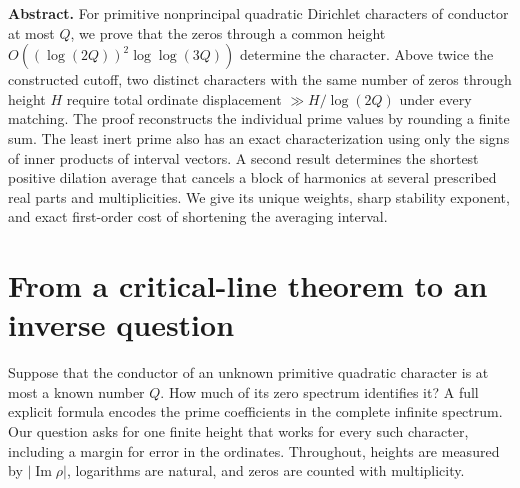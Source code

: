 \documentclass[11pt,letterpaper]{article}
\theoremstyle{remark}\newtheorem{remark}[theorem]{Remark}
\begin{document}
\thispagestyle{plain}
\vspace{.40cm}

\par
\vspace{3pt}
\par
\vspace{.35cm}

\noindent\textbf{Abstract.}
For primitive nonprincipal quadratic Dirichlet characters of conductor at most $Q$, we prove that the zeros through a common height $O((\log(2Q))^2\log\log(3Q))$ determine the character. Above twice the constructed cutoff, two distinct characters with the same number of zeros through height $H$ require total ordinate displacement $\gg H/\log(2Q)$ under every matching. The proof reconstructs the individual prime values by rounding a finite sum. The least inert prime also has an exact characterization using only the signs of inner products of interval vectors. A second result determines the shortest positive dilation average that cancels a block of harmonics at several prescribed real parts and multiplicities. We give its unique weights, sharp stability exponent, and exact first-order cost of shortening the averaging interval.

\section{From a critical-line theorem to an inverse question}
Suppose that the conductor of an unknown primitive quadratic character is at most a known number $Q$. How much of its zero spectrum identifies it? A full explicit formula encodes the prime coefficients in the complete infinite spectrum. Our question asks for one finite height that works for every such character, including a margin for error in the ordinates. Throughout, heights are measured by $|\operatorname{Im}\rho|$, logarithms are natural, and zeros are counted with multiplicity.
\end{document}
